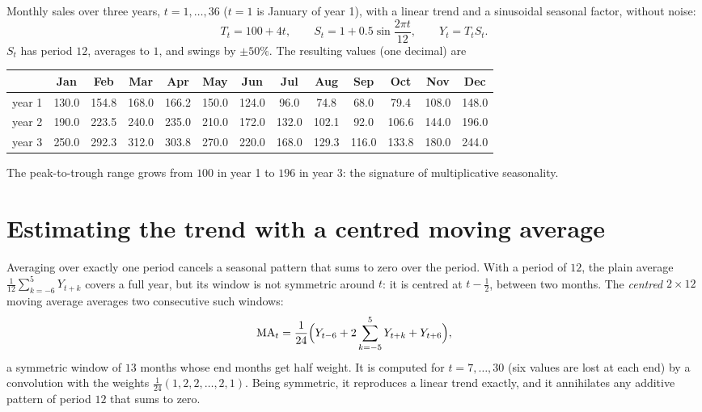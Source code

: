 \begin{notechapter}
\begin{example}\label{decomposition-forecasting:ex:series}
Monthly sales over three years, $t = 1,\dots,36$ ($t = 1$ is January of year 1), with a linear trend
and a sinusoidal seasonal factor, without noise:
\[
  T_t = 100 + 4t,\qquad S_t = 1 + 0.5\sin\frac{2\pi t}{12},\qquad Y_t = T_tS_t .
\]
$S_t$ has period $12$, averages to $1$, and swings by $\pm50\%$. The resulting values (one decimal) are
\begin{center}
\footnotesize\setlength{\tabcolsep}{3pt}
\begin{tabular}{@{}lcccccccccccc@{}}
\toprule
 & Jan & Feb & Mar & Apr & May & Jun & Jul & Aug & Sep & Oct & Nov & Dec \\
\midrule
year 1 & 130.0 & 154.8 & 168.0 & 166.2 & 150.0 & 124.0 & 96.0 & 74.8 & 68.0 & 79.4 & 108.0 & 148.0 \\
year 2 & 190.0 & 223.5 & 240.0 & 235.0 & 210.0 & 172.0 & 132.0 & 102.1 & 92.0 & 106.6 & 144.0 & 196.0 \\
year 3 & 250.0 & 292.3 & 312.0 & 303.8 & 270.0 & 220.0 & 168.0 & 129.3 & 116.0 & 133.8 & 180.0 & 244.0 \\
\bottomrule
\end{tabular}
\end{center}
The peak-to-trough range grows from $100$ in year 1 to $196$ in year 3: the signature of
multiplicative seasonality.
\end{example}

\section{Estimating the trend with a centred moving average}\label{decomposition-forecasting:sec:ma}

Averaging over exactly one period cancels a seasonal pattern that sums to zero over the
period. With a period of $12$, the plain average $\frac1{12}\sum_{k=-6}^5Y_{t+k}$ covers a full year, but its
window is not symmetric around $t$: it is centred at $t - \frac12$, between two months. The
\emph{centred} $2\times12$ moving average averages two consecutive such windows:
\[
  \mathrm{MA}_t = \frac1{24}\Bigl(Y_{t-6} + 2\sum_{k=-5}^5Y_{t+k} + Y_{t+6}\Bigr),
\]
a symmetric window of $13$ months whose end months get half weight. It is computed for
$t = 7,\dots,30$ (six values are lost at each end) by a convolution with the weights
$\frac1{24}(1, 2, 2,\dots,2, 1)$. Being symmetric, it reproduces a linear trend exactly, and it
annihilates any additive pattern of period $12$ that sums to zero.


\end{notechapter}

